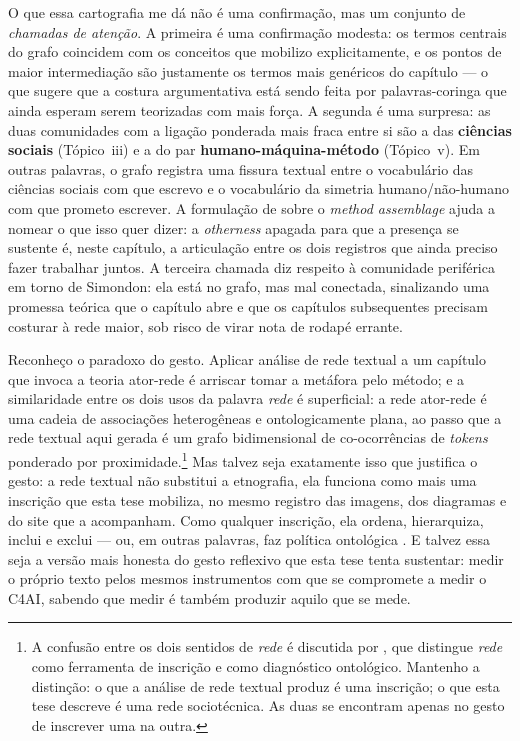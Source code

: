 O que essa cartografia me dá não é uma confirmação, mas um conjunto de
\textit{chamadas de atenção}. A primeira é uma confirmação modesta:
os termos centrais do grafo coincidem com os conceitos que mobilizo
explicitamente, e os pontos de maior intermediação são justamente os
termos mais genéricos do capítulo --- o que sugere que a costura
argumentativa está sendo feita por palavras-coringa que ainda esperam
serem teorizadas com mais força. A segunda é uma surpresa: as duas
comunidades com a ligação ponderada mais fraca entre si são a das
\textbf{ciências sociais} (Tópico~iii) e a do par
\textbf{humano-máquina-método} (Tópico~v).
Em outras palavras, o grafo registra uma fissura textual entre o
vocabulário das ciências sociais com que escrevo e o vocabulário da
simetria humano/não-humano com que prometo escrever. A formulação de
\textcite{Law2004After} sobre o \textit{method assemblage} ajuda a
nomear o que isso quer dizer: a \textit{otherness} apagada para que a
presença se sustente é, neste capítulo, a articulação entre os dois
registros que ainda preciso fazer trabalhar juntos. A terceira chamada
diz respeito à comunidade periférica em torno de Simondon: ela está no
grafo, mas mal conectada, sinalizando uma promessa teórica que o
capítulo abre e que os capítulos subsequentes precisam costurar à rede
maior, sob risco de virar nota de rodapé errante.

Reconheço o paradoxo do gesto. Aplicar análise de rede textual a um
capítulo que invoca a teoria ator-rede é arriscar tomar a metáfora
pelo método; e a similaridade entre os dois usos da palavra
\textit{rede} é superficial: a rede ator-rede é uma cadeia de
associações heterogêneas e ontologicamente plana, ao passo que a rede
textual aqui gerada é um grafo bidimensional de co-ocorrências de
\textit{tokens} ponderado por proximidade.\footnote{A confusão entre
os dois sentidos de \textit{rede} é discutida por
\textcite[pp.~129--132]{latour2005reassembling}, que distingue
\textit{rede} como ferramenta de inscrição e como diagnóstico
ontológico. Mantenho a distinção: o que a análise de rede textual
produz é uma inscrição; o que esta tese descreve é uma rede
sociotécnica. As duas se encontram apenas no gesto de inscrever uma
na outra.} Mas talvez seja exatamente isso que justifica
o gesto: a rede textual não substitui a etnografia, ela funciona como
mais uma inscrição que esta tese mobiliza, no mesmo registro das
imagens, dos diagramas e do site que a acompanham. Como qualquer
inscrição, ela ordena, hierarquiza, inclui e exclui --- ou, em outras
palavras, faz política ontológica \parencite[p.~143]{Law2004After}. E
talvez essa seja a versão mais honesta do gesto reflexivo que esta
tese tenta sustentar: medir o próprio texto pelos mesmos instrumentos
com que se compromete a medir o C4AI, sabendo que medir é também
produzir aquilo que se mede.


